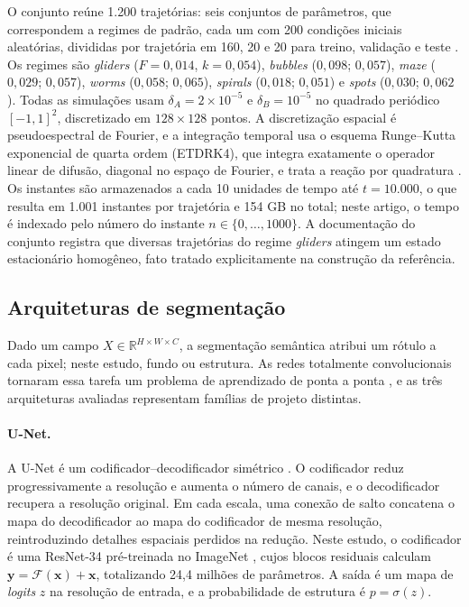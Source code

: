 \documentclass[12pt]{article}
\begin{document}
O conjunto reúne 1.200 trajetórias: seis conjuntos de parâmetros, que correspondem a regimes de padrão, cada um com 200 condições iniciais aleatórias, divididas por trajetória em 160, 20 e 20 para treino, validação e teste \cite{ohana2024well}. Os regimes são \textit{gliders} ($F=0{,}014$, $k=0{,}054$), \textit{bubbles} ($0{,}098$; $0{,}057$), \textit{maze} ($0{,}029$; $0{,}057$), \textit{worms} ($0{,}058$; $0{,}065$), \textit{spirals} ($0{,}018$; $0{,}051$) e \textit{spots} ($0{,}030$; $0{,}062$). Todas as simulações usam $\delta_A=2\times10^{-5}$ e $\delta_B=10^{-5}$ no quadrado periódico $[-1,1]^2$, discretizado em $128\times128$ pontos. A discretização espacial é pseudoespectral de Fourier, e a integração temporal usa o esquema Runge--Kutta exponencial de quarta ordem (ETDRK4), que integra exatamente o operador linear de difusão, diagonal no espaço de Fourier, e trata a reação por quadratura \cite{cox2002,kassam2005}. Os instantes são armazenados a cada 10 unidades de tempo até $t=10.000$, o que resulta em 1.001 instantes por trajetória e 154 GB no total; neste artigo, o tempo é indexado pelo número do instante $n\in\{0,\dots,1000\}$. A documentação do conjunto registra que diversas trajetórias do regime \textit{gliders} atingem um estado estacionário homogêneo, fato tratado explicitamente na construção da referência.

\subsection{Arquiteturas de segmentação}
\label{subsec:arquiteturas}

Dado um campo $X\in\mathbb{R}^{H\times W\times C}$, a segmentação semântica atribui um rótulo a cada pixel; neste estudo, fundo ou estrutura. As redes totalmente convolucionais tornaram essa tarefa um problema de aprendizado de ponta a ponta \cite{long2015fcn}, e as três arquiteturas avaliadas representam famílias de projeto distintas.

\paragraph{U-Net.} A U-Net é um codificador--decodificador simétrico \cite{ronneberger2015unet}. O codificador reduz progressivamente a resolução e aumenta o número de canais, e o decodificador recupera a resolução original. Em cada escala, uma conexão de salto concatena o mapa do decodificador ao mapa do codificador de mesma resolução, reintroduzindo detalhes espaciais perdidos na redução. Neste estudo, o codificador é uma ResNet-34 pré-treinada no ImageNet \cite{he2016resnet,deng2009imagenet}, cujos blocos residuais calculam $\mathbf{y}=\mathcal{F}(\mathbf{x})+\mathbf{x}$, totalizando 24,4 milhões de parâmetros. A saída é um mapa de \textit{logits} $z$ na resolução de entrada, e a probabilidade de estrutura é $p=\sigma(z)$.
\end{document}
